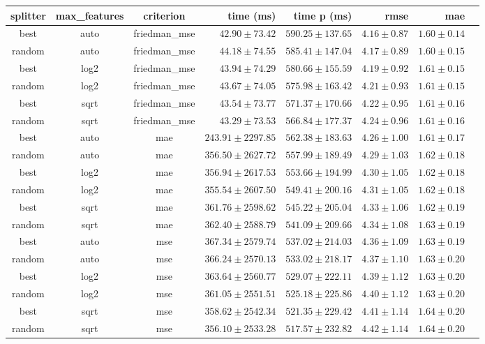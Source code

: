 \begin{tabular}{cccrrrrr}
\toprule
\textbf{splitter} & \textbf{max\_features} & \textbf{criterion} & \textbf{time (ms)} & \textbf{time p (ms)} & \textbf{rmse} & \textbf{mae}\\
\midrule
best & auto & friedman_mse & $42.90 \pm 73.42$ & $590.25 \pm 137.65$ & $4.16 \pm 0.87$ & $1.60 \pm 0.14$\\
random & auto & friedman_mse & $44.18 \pm 74.55$ & $585.41 \pm 147.04$ & $4.17 \pm 0.89$ & $1.60 \pm 0.15$\\
best & log2 & friedman_mse & $43.94 \pm 74.29$ & $580.66 \pm 155.59$ & $4.19 \pm 0.92$ & $1.61 \pm 0.15$\\
random & log2 & friedman_mse & $43.67 \pm 74.05$ & $575.98 \pm 163.42$ & $4.21 \pm 0.93$ & $1.61 \pm 0.15$\\
best & sqrt & friedman_mse & $43.54 \pm 73.77$ & $571.37 \pm 170.66$ & $4.22 \pm 0.95$ & $1.61 \pm 0.16$\\
random & sqrt & friedman_mse & $43.29 \pm 73.53$ & $566.84 \pm 177.37$ & $4.24 \pm 0.96$ & $1.61 \pm 0.16$\\
best & auto & mae & $243.91 \pm 2297.85$ & $562.38 \pm 183.63$ & $4.26 \pm 1.00$ & $1.61 \pm 0.17$\\
random & auto & mae & $356.50 \pm 2627.72$ & $557.99 \pm 189.49$ & $4.29 \pm 1.03$ & $1.62 \pm 0.18$\\
best & log2 & mae & $356.94 \pm 2617.53$ & $553.66 \pm 194.99$ & $4.30 \pm 1.05$ & $1.62 \pm 0.18$\\
random & log2 & mae & $355.54 \pm 2607.50$ & $549.41 \pm 200.16$ & $4.31 \pm 1.05$ & $1.62 \pm 0.18$\\
best & sqrt & mae & $361.76 \pm 2598.62$ & $545.22 \pm 205.04$ & $4.33 \pm 1.06$ & $1.62 \pm 0.19$\\
random & sqrt & mae & $362.40 \pm 2588.79$ & $541.09 \pm 209.66$ & $4.34 \pm 1.08$ & $1.63 \pm 0.19$\\
best & auto & mse & $367.34 \pm 2579.74$ & $537.02 \pm 214.03$ & $4.36 \pm 1.09$ & $1.63 \pm 0.19$\\
random & auto & mse & $366.24 \pm 2570.13$ & $533.02 \pm 218.17$ & $4.37 \pm 1.10$ & $1.63 \pm 0.20$\\
best & log2 & mse & $363.64 \pm 2560.77$ & $529.07 \pm 222.11$ & $4.39 \pm 1.12$ & $1.63 \pm 0.20$\\
random & log2 & mse & $361.05 \pm 2551.51$ & $525.18 \pm 225.86$ & $4.40 \pm 1.12$ & $1.63 \pm 0.20$\\
best & sqrt & mse & $358.62 \pm 2542.34$ & $521.35 \pm 229.42$ & $4.41 \pm 1.14$ & $1.64 \pm 0.20$\\
random & sqrt & mse & $356.10 \pm 2533.28$ & $517.57 \pm 232.82$ & $4.42 \pm 1.14$ & $1.64 \pm 0.20$\\
\bottomrule
\end{tabular}
